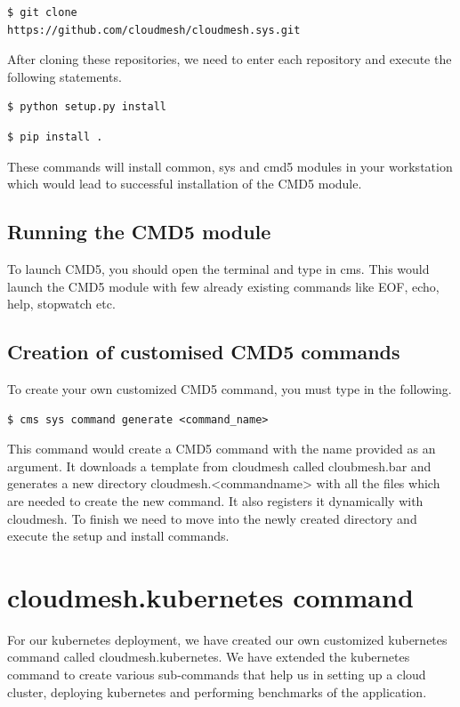 \documentclass[9pt,twocolumn,twoside]{../../styles/osajnl}
\begin{document}
{\begin{verbatim}
$ git clone
https://github.com/cloudmesh/cloudmesh.sys.git
\end{verbatim}

\noindent
After cloning these repositories, we need to enter each repository and
execute the following statements.

\begin{verbatim}
$ python setup.py install
\end{verbatim}

\begin{verbatim}
$ pip install .
\end{verbatim}

\noindent
These commands will install common, sys and cmd5 modules in your
workstation which would lead to successful installation of the CMD5
module.

\subsection{Running the CMD5 module}
To launch CMD5, you should open the terminal and type in cms. This
would launch the CMD5 module with few already existing commands like
EOF, echo, help, stopwatch etc.

\subsection{Creation of customised CMD5 commands}
To create your own customized CMD5 command, you must type in the
following.

\begin{verbatim}
$ cms sys command generate <command_name>
\end{verbatim}

\noindent
This command would create a CMD5 command with the name provided as an
argument. It downloads a template from cloudmesh called cloubmesh.bar
and generates a new directory cloudmesh.<command\textunderscore name>
with all the files which are needed to create the new command. It also
registers it dynamically with cloudmesh. To finish we need to move
into the newly created directory and execute the setup and install
commands.

\section{cloudmesh.kubernetes command}
For our kubernetes deployment, we have
created our own customized kubernetes command called
cloudmesh.kubernetes. We have extended the kubernetes command to
create various sub-commands that help us in setting up a cloud cluster,
deploying kubernetes and performing benchmarks of the application.

}
\end{document}
